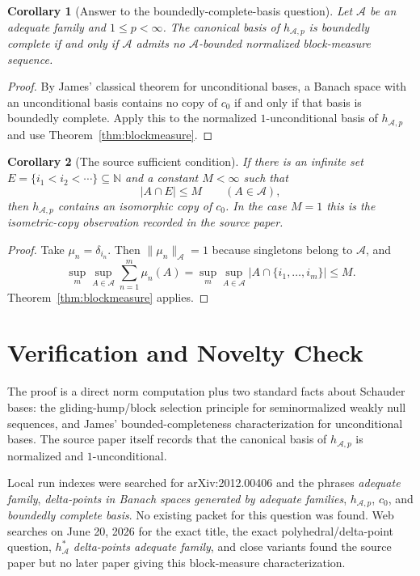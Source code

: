 \documentclass[11pt]{article}
\newtheorem{corollary}{Corollary}
\newcommand{\N}{\mathbb N}
\newcommand{\A}{\mathcal A}
\begin{document}
\begin{corollary}[Answer to the boundedly-complete-basis question]
Let \(\A\) be an adequate family and \(1\leq p<\infty\). The canonical basis
of \(h_{\A,p}\) is boundedly complete if and only if \(\A\) admits no
\(\A\)-bounded normalized block-measure sequence.
\end{corollary}

\begin{proof}
By James' classical theorem for unconditional bases, a Banach space with an
unconditional basis contains no copy of \(c_0\) if and only if that basis is
boundedly complete. Apply this to the normalized \(1\)-unconditional basis of
\(h_{\A,p}\) and use Theorem~\ref{thm:blockmeasure}.
\end{proof}

\begin{corollary}[The source sufficient condition]
If there is an infinite set \(E=\{i_1<i_2<\cdots\}\subseteq\N\) and a constant
\(M<\infty\) such that
\[
  |A\cap E|\leq M\qquad(A\in\A),
\]
then \(h_{\A,p}\) contains an isomorphic copy of \(c_0\). In the case \(M=1\)
this is the isometric-copy observation recorded in the source paper.
\end{corollary}

\begin{proof}
Take \(\mu_n=\delta_{i_n}\). Then \(\|\mu_n\|_{\A}=1\) because singletons
belong to \(\A\), and
\[
  \sup_{m}\sup_{A\in\A}\sum_{n=1}^{m}\mu_n(A)
  =
  \sup_m\sup_{A\in\A}|A\cap\{i_1,\ldots,i_m\}|
  \leq M.
\]
Theorem~\ref{thm:blockmeasure} applies.
\end{proof}

\section*{Verification and Novelty Check}

The proof is a direct norm computation plus two standard facts about Schauder
bases: the gliding-hump/block selection principle for seminormalized weakly
null sequences, and James' bounded-completeness characterization for
unconditional bases. The source paper itself records that the canonical basis
of \(h_{\A,p}\) is normalized and \(1\)-unconditional.

Local run indexes were searched for arXiv:2012.00406 and the phrases
\emph{adequate family}, \emph{delta-points in Banach spaces generated by
adequate families}, \emph{\(h_{\A,p}\)}, \emph{\(c_0\)}, and
\emph{boundedly complete basis}. No existing packet for this question was
found. Web searches on June 20, 2026 for the exact title, the exact
polyhedral/delta-point question, \emph{\(h_{\A}^{*}\) delta-points adequate
family}, and close variants found the source paper but no later paper giving
this block-measure characterization.
\end{document}
